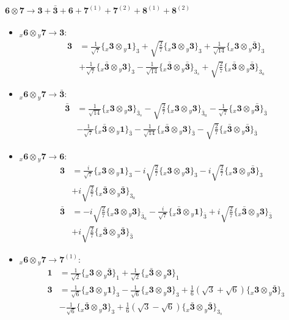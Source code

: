 \documentclass[english]{article}
\newcommand{\cgEqFontsize}{\large}
\newcommand{\rep}[1]{\mathbf{#1}}
\newcommand{\repx}[2]{{}_{#2}\mathbf{#1}}
\newcommand{\tsprod}[2]{\rep{#1}\otimes\rep{#2}}
\newcommand{\tsprodx}[2]{\repx{#1}{x}\otimes\repx{#2}{y}}
\newcommand{\subcgt}[3]{\big\{ \tsprodx{#1}{#2}\big\}^{}_{#3}}
\begin{document}
\paragraph*{\cgEqFontsize $\tsprod{6}{7}\to\rep{3}+\rep{\bar{3}}+\rep{6}+\rep{7}^{(1)}+\rep{7}^{(2)}+\rep{8}^{(1)}+\rep{8}^{(2)}$}
\begin{itemize}
\item $\tsprodx{6}{7}\to\rep{3}$:
\begin{align*}
\rep{3} & = \frac{1}{\sqrt{7}}\subcgt{3}{1}{3}+\sqrt{\frac{2}{7}}\subcgt{3}{3}{3}+\frac{1}{\sqrt{14}}\subcgt{3}{\bar{3}}{3} \\ 
 & +\frac{1}{\sqrt{7}}\subcgt{\bar{3}}{3}{3}-\frac{1}{\sqrt{14}}\subcgt{\bar{3}}{\bar{3}}{3_{s}}+\sqrt{\frac{2}{7}}\subcgt{\bar{3}}{\bar{3}}{3_{a}}
\end{align*}
\item $\tsprodx{6}{7}\to\rep{\bar{3}}$:
\begin{align*}
\rep{\bar{3}} & = \frac{1}{\sqrt{14}}\subcgt{3}{3}{\bar{3}_{s}}-\sqrt{\frac{2}{7}}\subcgt{3}{3}{\bar{3}_{a}}-\frac{1}{\sqrt{7}}\subcgt{3}{\bar{3}}{\bar{3}} \\ 
 & -\frac{1}{\sqrt{7}}\subcgt{\bar{3}}{1}{\bar{3}}-\frac{1}{\sqrt{14}}\subcgt{\bar{3}}{3}{\bar{3}}-\sqrt{\frac{2}{7}}\subcgt{\bar{3}}{\bar{3}}{\bar{3}}
\end{align*}
\item $\tsprodx{6}{7}\to\rep{6}$:
\begin{align*}
\rep{3} & = \frac{i}{\sqrt{7}}\subcgt{3}{1}{3}-i \sqrt{\frac{2}{7}}\subcgt{3}{3}{3}-i \sqrt{\frac{2}{7}}\subcgt{3}{\bar{3}}{3} \\ 
 & +i \sqrt{\frac{2}{7}}\subcgt{\bar{3}}{\bar{3}}{3_{a}}
\\
\rep{\bar{3}} & = -i \sqrt{\frac{2}{7}}\subcgt{3}{3}{\bar{3}_{a}}-\frac{i}{\sqrt{7}}\subcgt{\bar{3}}{1}{\bar{3}}+i \sqrt{\frac{2}{7}}\subcgt{\bar{3}}{3}{\bar{3}} \\ 
 & +i \sqrt{\frac{2}{7}}\subcgt{\bar{3}}{\bar{3}}{\bar{3}}
\end{align*}
\item $\tsprodx{6}{7}\to\rep{7}^{(1)}$:
\begin{align*}
\rep{1} & = \frac{1}{\sqrt{2}}\subcgt{3}{\bar{3}}{1}+\frac{1}{\sqrt{2}}\subcgt{\bar{3}}{3}{1}
\\
\rep{3} & = \frac{1}{\sqrt{6}}\subcgt{3}{1}{3}-\frac{1}{\sqrt{6}}\subcgt{3}{3}{3}+\frac{1}{6} \left(\sqrt{3}+\sqrt{6}\right)\subcgt{3}{\bar{3}}{3} \\ 
 & -\frac{1}{\sqrt{6}}\subcgt{\bar{3}}{3}{3}+\frac{1}{6} \left(\sqrt{3}-\sqrt{6}\right)\subcgt{\bar{3}}{\bar{3}}{3_{s}}

\end{align*}
\end{itemize}
\end{document}
